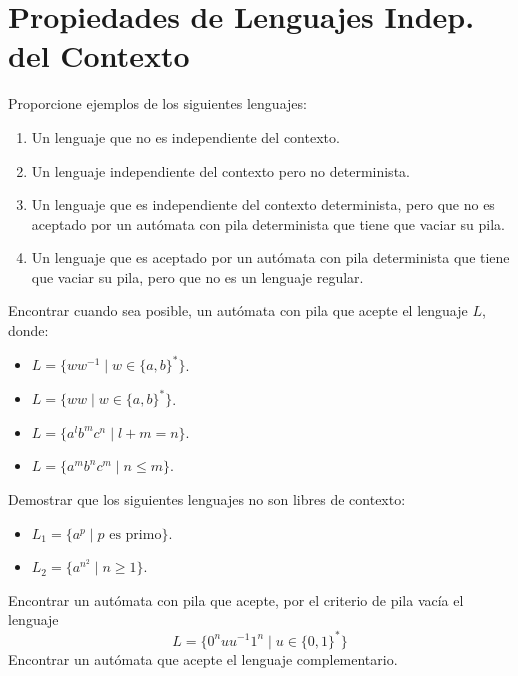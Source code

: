 \newpage
\section{Propiedades de Lenguajes Indep. del Contexto}

\begin{ejercicio}\label{ej:1.6.1}
    Proporcione ejemplos de los siguientes lenguajes:
    \begin{enumerate}
        \item Un lenguaje que no es independiente del contexto.
        \item Un lenguaje independiente del contexto pero no determinista.
        \item Un lenguaje que es independiente del contexto determinista, pero que no es aceptado por un autómata con pila determinista que tiene que vaciar su pila.
        \item Un lenguaje que es aceptado por un autómata con pila determinista que tiene que vaciar su pila, pero que no es un lenguaje regular.
    \end{enumerate}
\end{ejercicio}

\begin{ejercicio}\label{ej:1.6.2}
    Encontrar cuando sea posible, un autómata con pila que acepte el lenguaje $L$, donde:
    \begin{itemize}
        \item $L = \{ww^{-1}\mid w\in {\{a,b\}}^{\ast}\}$.
        \item $L = \{ww\mid w \in {\{a,b\}}^{\ast}\}$.
        \item $L = \{a^l b^m c^n \mid l + m = n\}$.
        \item $L = \{a^m b^n c^m \mid n\leq m\}$.
    \end{itemize}
\end{ejercicio}

\begin{ejercicio}\label{ej:1.6.3}
    Demostrar que los siguientes lenguajes no son libres de contexto:
    \begin{itemize}
        \item $L_1 = \{a^p \mid p \text{\ es primo}\}$.
        \item $L_2 = \{a^{n^2}\mid n\geq 1\}$.
    \end{itemize}
\end{ejercicio}

\begin{ejercicio}\label{ej:1.6.4}
    Encontrar un autómata con pila que acepte, por el criterio de pila vacía el lenguaje
    \begin{equation*}
        L = \{0^n uu^{-1}1^n \mid u\in {\{0,1\}}^{\ast}\}
    \end{equation*}
    Encontrar un autómata que acepte el lenguaje complementario.
\end{ejercicio}

